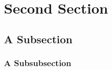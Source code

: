 \section{Second Section}
\lipsum[3]

\subsection{A Subsection}
\lipsum[2]

\subsubsection{A Subsubsection}
\lipsum[1]
